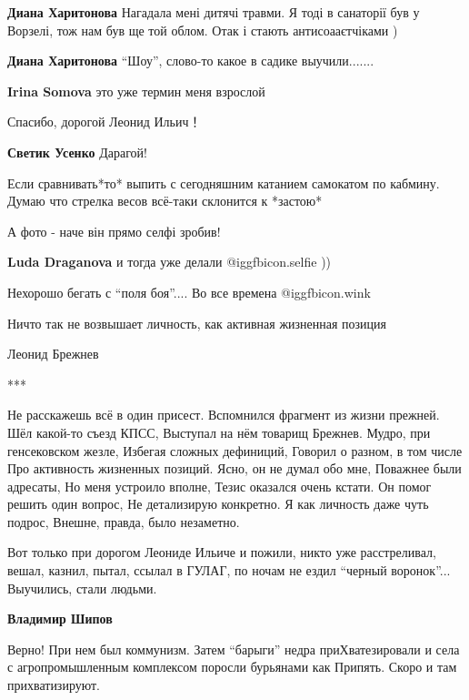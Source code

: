 \begin{itemize}
\begin{itemize}
\textbf{Диана Харитонова} Нагадала мені дитячі травми. Я тоді в санаторії був у Ворзелі, тож нам був ще той облом. Отак і стають антисоааєтчіками )

\textbf{Диана Харитонова} \enquote{Шоу}, слово-то какое в садике выучили.......

\textbf{Irina Somova} это уже термин меня взрослой
\end{itemize} %

Спасибо, дорогой Леонид Ильич！

\textbf{Светик Усенко} Дарагой!


Если сравнивать*то* выпить с сегодняшним катанием самокатом по кабмину. Думаю
что стрелка весов всё-таки склонится к *застою*

А фото - наче він прямо селфі зробив!

\textbf{Luda Draganova} и тогда уже делали  @igg{fbicon.selfie} ))

Нехорошо бегать с \enquote{поля боя}.... Во все времена  @igg{fbicon.wink} 


Ничто так не возвышает личность, как активная жизненная позиция

Леонид Брежнев

***

\obeycr
Не расскажешь всё в один присест.
Вспомнился фрагмент из жизни прежней.
Шёл какой-то съезд КПСС,
Выступал на нём товарищ Брежнев.
\smallskip
Мудро, при генсековском жезле,
Избегая сложных дефиниций,
Говорил о разном, в том числе
Про активность жизненных позиций.
\smallskip
Ясно, он не думал обо мне,
Поважнее были адресаты,
Но меня устроило вполне,
Тезис оказался очень кстати.
\smallskip
Он помог решить один вопрос,
Не детализирую конкретно.
Я как личность даже чуть подрос,
Внешне, правда, было незаметно.
\restorecr


Вот только при дорогом Леониде Ильиче и пожили, никто уже расстреливал, вешал,
казнил, пытал, ссылал в ГУЛАГ, по ночам не ездил \enquote{черный воронок}... Выучились,
стали людьми.

\begin{itemize} %
\textbf{Владимир Шипов} 

Верно! При нем был коммунизм. Затем \enquote{барыги} недра приХватезировали и села с
агропромышленным комплексом поросли бурьянами как Припять. Скоро и там
прихватизируют.



\end{itemize}
\end{itemize}
